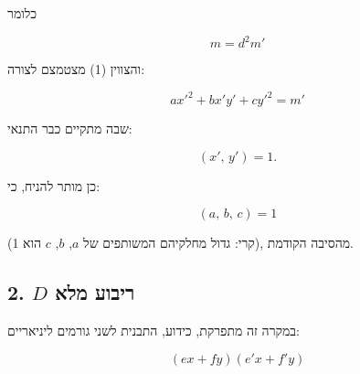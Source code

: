 כלומר

\[ m = d^2 m' \]

והצווין (1) מצטמצם לצורה:

\[ ax'^2 + bx'y' + cy'^2 = m' \]

שבה מתקיים כבר התנאי:

\[ (x',\,y') = 1. \]

כן מותר להניח, כי:

\[ (a,\,b,\,c) = 1 \tag{3} \]

(קרי: גדול מחלקיהם המשותפים של $a$, $b$, $c$ הוא 1), מהסיבה הקודמת.

\subsection*{2. $D$ ריבוע מלא}

במקרה זה מתפרקת, כידוע, התבנית לשני גורמים ליניאריים:

\[ (ex+fy)(e'x+f'y) \tag{4} \]

